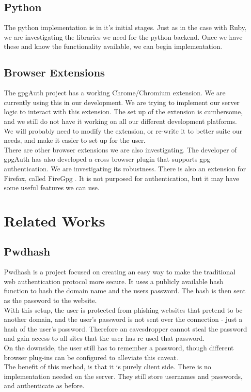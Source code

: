 \documentclass[11pt]{article}
\begin{document}
\subsection{Python} \label{subsec:python}
The python implementation is in it's initial stages. Just as in the case with Ruby, we are investigating the libraries we need for the python backend. Once we have these and know the functionality available, we can begin implementation.
\subsection{Browser Extensions} \label{subsec:browser}
The gpgAuth project \cite{gpgauth} has a working Chrome/Chromium extension. We are currently using this in our development. We are trying to implement our server logic to interact with this extension. The set up of the extension is cumbersome, and we still do not have it working on all our different development platforms. We will probably need to modify the extension, or re-write it to better suite our needs, and make it easier to set up for the user.\\
There are other browser extensions we are also investigating. The developer of gpgAuth has also developed a cross browser plugin that supports gpg authentication. We are investigating its robustness. There is also an extension for Firefox, called FireGpg \cite{firegpg}. It is not purposed for authentication, but it may have some useful features we can use. 


\section{Related Works} \label{sec:relatedWorks}
\subsection{Pwdhash} 
Pwdhash\cite{pwdhash} is a project focused on creating an easy way to make the traditional web authentication protocol more secure. It uses a publicly available hash function to hash the domain name and the users password. The hash is then sent as the password to the website.\\
	With this setup, the user is protected from phishing websites that pretend to be another domain, and the user’s password is not sent over the connection - just a hash of the user's password. Therefore an eavesdropper cannot steal the password and gain access to all sites that the user has re-used that password.\\
	On the downside, the user still has to remember a password, though different browser plug-ins can be configured to alleviate this caveat.\\
The benefit of this method, is that it is purely client side. There is no implementation needed on the server. They still store usernames and passwords, and authenticate as before.
\end{document}
